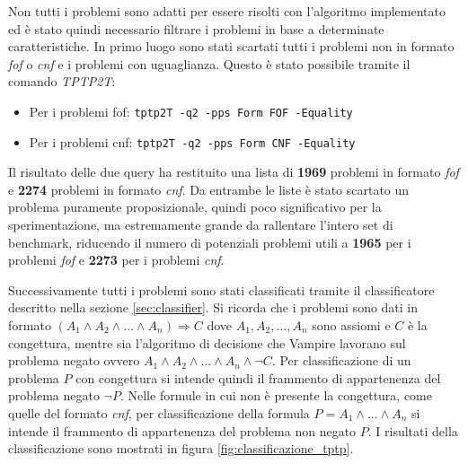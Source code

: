 \documentclass[./main.tex]{subfiles}
\begin{document}
Non tutti i problemi sono adatti per essere risolti con l'algoritmo implementato ed è 
stato quindi necessario filtrare i problemi in base a determinate caratteristiche.
In primo luogo sono stati scartati tutti i problemi non in formato \textit{fof} o \textit{cnf} e
i problemi con uguaglianza. Questo è stato possibile tramite il comando \textit{TPTP2T}:

\begin{itemize}
    \item Per i problemi fof: \texttt{tptp2T -q2 -pps Form FOF -Equality}
    \item Per i problemi cnf: \texttt{tptp2T -q2 -pps Form CNF -Equality}
\end{itemize}

Il risultato delle due query ha restituito una lista di \textbf{1969} problemi in formato \textit{fof} e
\textbf{2274} problemi in formato \textit{cnf}. 
Da entrambe le liste è stato scartato un problema puramente proposizionale,
quindi poco significativo per la sperimentazione, ma estremamente grande da rallentare l'intero set di benchmark,
riducendo il numero di potenziali problemi utili a \textbf{1965} per i problemi \textit{fof} e \textbf{2273} per i problemi \textit{cnf}.

Successivamente tutti i problemi sono stati classificati tramite il classificatore descritto nella sezione \ref{sec:classifier}.
Si ricorda che i problemi sono dati in formato $(A_1 \land A_2 \land ... \land A_n) \Rightarrow C$ dove 
$A_1, A_2, ..., A_n$ sono assiomi e $C$ è la congettura, mentre 
sia l'algoritmo di decisione che Vampire lavorano sul problema negato ovvero $A_1 \land A_2 \land ... \land A_n \land \lnot C$.
Per classificazione di un problema $P$ con congettura si intende quindi il frammento di appartenenza del problema negato $\lnot P$.
Nelle formule in cui non è presente la congettura, come quelle del formato \textit{cnf}, 
per classificazione della formula $P = A_1 \land ... \land A_n$ si intende il frammento di appartenenza del
problema non negato $P$.
I risultati della classificazione sono mostrati in figura \ref{fig:classificazione_tptp}.
\end{document}
